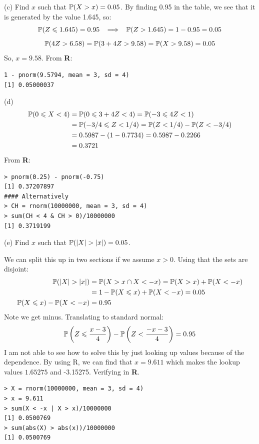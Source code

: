\newpage\noindent
(c) Find $x$ such that $\P(X > x) = 0.05$. By finding 0.95 in the table, we see that it is generated
by the value 1.645, so:
$$
\P(Z\leq 1.645) = 0.95 \imp \P(Z > 1.645) = 1 - 0.95 = 0.05
$$
$$
\P(4Z > 6.58) = \P(3 + 4Z > 9.58) = \P(X > 9.58) = 0.05
$$
So, $x = 9.58$.
From \textbf{R}:
\begin{verbatim}
1 - pnorm(9.5794, mean = 3, sd = 4)
[1] 0.05000037
\end{verbatim}
(d)
\begin{align*}
    \P(0\leq X < 4) &= \P(0\leq 3 + 4Z < 4) = \P(-3 \leq 4Z < 1)\\
    &= \P(-3/4 \leq Z < 1/4) = \P(Z < 1/4) - \P(Z < -3/4) \\
    &= 0.5987 - (1 - 0.7734) = 0.5987 - 0.2266 \\
    &= 0.3721
\end{align*}
From \textbf{R}:
\begin{verbatim}
> pnorm(0.25) - pnorm(-0.75)
[1] 0.37207897
#### Alternatively
> CH = rnorm(10000000, mean = 3, sd = 4)
> sum(CH < 4 & CH > 0)/10000000
[1] 0.3719199
\end{verbatim}
(e) Find $x$ such that $\P(|X| > |x|) = 0.05$.

We can split this up in two sections if we assume $x>0$. Using that the sets are disjoint:
\begin{align*}
    \P(|X| > |x|) &= \P(X > x\cap X < -x) = \P(X > x) + \P(X < -x) \\
    &= 1 - \P(X\leq x) + \P(X < - x) = 0.05 \\
    \P(X\leq x) - \P(X < - x) &= 0.95
\end{align*}
Note we get minus. Translating to standard normal:
$$
\P\left(Z\leq \frac{x - 3}{4}\right) - \P\left(Z < \frac{-x - 3}{4}\right) = 0.95
$$
I am not able to see how to solve this by just looking up values because of the dependence.
By using R, we can find that $x = 9.611$ which makes the lookup values $1.65275$ and -3.15275.
Verifying in \textbf{R}.
\begin{verbatim}
> X = rnorm(10000000, mean = 3, sd = 4)
> x = 9.611
> sum(X < -x | X > x)/10000000
[1] 0.0500769
> sum(abs(X) > abs(x))/10000000
[1] 0.0500769
\end{verbatim}



